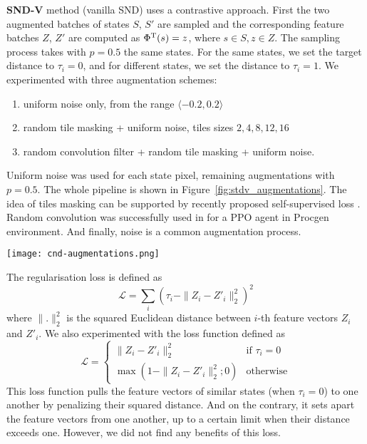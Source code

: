 \documentclass[a4paper,11pt]{elsarticle}
\begin{document}
\textbf{SND-V} method (vanilla SND) uses a contrastive approach.
First the two augmented batches of states $S$, $S'$ are sampled and the corresponding feature batches $Z$, $Z'$ are computed as $\Phi^{\rm T}(s) = z$, where $s \in S, z \in Z$.
The sampling process takes with $p=0.5$ the same states.
For the same states, we set the target distance to $\tau_i = 0$, and for different states, we set the distance to $\tau_i =1$.
We experimented with three augmentation schemes: 
\begin{enumerate}
  \item uniform noise only, from the range $\langle -0.2, 0.2\rangle$
  \item random tile masking + uniform noise, tiles sizes $2, 4, 8, 12, 16$
  \item random convolution filter + random tile masking + uniform noise.
\end{enumerate}
Uniform noise was used for each state pixel, remaining augmentations with $p=0.5$. The whole pipeline is shown in Figure~\ref{fig:stdv_augmentations}. 
The idea of tiles masking can be supported by recently proposed self-supervised loss \citep{assran2022maskednetworks}. Random convolution was successfully used in \citep{lee2020randomization} for a PPO agent in Procgen environment. And finally, noise is a common augmentation process.
\begin{figure*}
\centering
\texttt{[image: cnd-augmentations.png]}
\caption{The scheme of the state augmentation pipeline.}
\label{fig:stdv_augmentations}
\end{figure*}
The regularisation loss is defined as
\begin{equation}
\label{eq:sndv1}
\mathcal{L} = \sum_{i}(\tau_i - \|Z_i - Z'_i\|^2_2)^2
\end{equation}
where $\|.\|^2_2$ is the squared Euclidean distance between $i$-{\rm th} feature vectors $Z_i$ and $Z'_i$. 
We also experimented with the loss function defined as
\begin{equation}
\label{eq:sndv2}
\mathcal{L} = 
  \begin{cases}
    \|Z_i - Z'_i\|^2_2 & \text{if $\tau_i = 0$} \\
    \max(1 - \|Z_i - Z'_i\|^2_2; 0) & \text{otherwise}
  \end{cases}
\end{equation}
This loss function pulls the feature vectors of similar states (when $\tau_i = 0$) to one another by penalizing their squared distance. And on the contrary, it sets apart the feature vectors from one another, up to a certain limit when their distance exceeds one.
However, we did not find any benefits of this loss.
\end{document}
